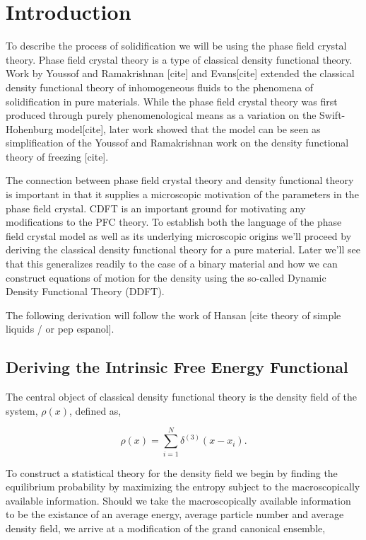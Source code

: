 \section{Introduction}
To describe the process of solidification we will be using the phase field crystal theory. Phase field crystal theory is a type of classical density functional theory. Work by Youssof and Ramakrishnan [cite] and Evans[cite] extended the classical density functional theory of inhomogeneous fluids to the phenomena of solidification in pure materials. While the phase field crystal theory was first produced through purely phenomenological means as a variation on the Swift-Hohenburg model[cite], later work showed that the model can be seen as simplification of the Youssof and Ramakrishnan work on the density functional theory of freezing [cite]. 

The connection between phase field crystal theory and density functional theory is important in that it supplies a microscopic motivation of the parameters in the phase field crystal. CDFT is an important ground for motivating any modifications to the PFC theory. To establish both the language of the phase field crystal model as well as its underlying microscopic origins we'll proceed by deriving the classical density functional theory for a pure material. Later we'll see that this generalizes readily to the case of a binary material and how we can construct equations of motion for the density using the so-called Dynamic Density Functional Theory (DDFT). 

The following derivation will follow the work of Hansan [cite theory of simple liquids / or pep espanol].

\subsection{Deriving the Intrinsic Free Energy Functional}

The central object of classical density functional theory is the density field of the system, $\rho(x)$, defined as, 

\begin{equation}
    \rho(x) = \sum_{i=1}^N \delta^{(3)}(x - x_i).
\end{equation}

To construct a statistical theory for the density field we begin by finding the equilibrium probability by maximizing the entropy subject to the macroscopically available information. Should we take the macroscopically available information to be the existance of an average energy, average particle number and average density field, we arrive at a modification of the grand canonical ensemble, 

